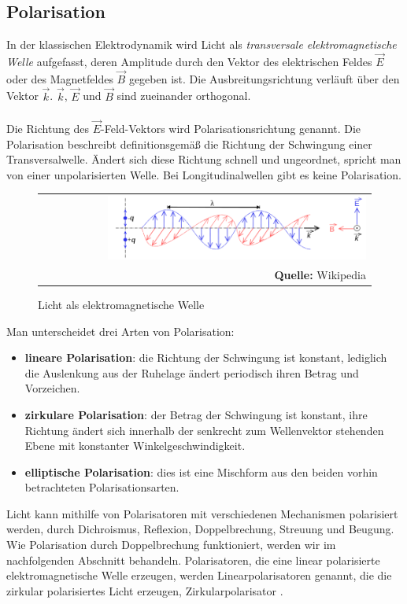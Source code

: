\documentclass[a4paper,titlepage]{scrartcl}
\numberwithin{equation}{section}
\begin{document}
\subsection{Polarisation}
In der klassischen Elektrodynamik wird Licht als \emph{transversale elektromagnetische Welle} aufgefasst, deren Amplitude durch den Vektor des elektrischen Feldes $\vec{E}$ oder des Magnetfeldes $\vec{B}$ gegeben ist. Die Ausbreitungsrichtung verläuft über den Vektor $\vec{k}$. $\vec{k}$, $\vec{E}$ und $\vec{B}$ sind zueinander orthogonal.\\ \\
Die Richtung des $\vec{E}$-Feld-Vektors wird Polarisationsrichtung genannt. Die Polarisation beschreibt definitionsgemäß die Richtung der Schwingung einer Transversalwelle. Ändert sich diese Richtung schnell und ungeordnet, spricht man von einer unpolarisierten Welle. Bei Longitudinalwellen gibt es keine Polarisation.
\begin{figure}[H]
	\centering
	\begin{tabular}{@{}r@{}}
		\includegraphics[width=0.8\textwidth]{bilder/licht.png}\\
		\footnotesize\sffamily\textbf{Quelle:} Wikipedia \cite{wiki:licht}
	\end{tabular}
	\caption{Licht als elektromagnetische Welle}
	\label{fig:licht}
\end{figure}
Man unterscheidet drei Arten von Polarisation:
\begin{itemize}
\item \textbf{lineare Polarisation}: die Richtung der Schwingung ist konstant, lediglich die Auslenkung aus der Ruhelage ändert periodisch ihren Betrag und Vorzeichen.
\item \textbf{zirkulare Polarisation}: der Betrag der Schwingung ist konstant, ihre Richtung ändert sich innerhalb der senkrecht zum Wellenvektor stehenden Ebene mit konstanter Winkelgeschwindigkeit.
\item \textbf{elliptische Polarisation}: dies ist eine Mischform aus den beiden vorhin betrachteten Polarisationsarten.
\end{itemize}
Licht kann mithilfe von Polarisatoren mit verschiedenen Mechanismen polarisiert werden, durch Dichroismus, Reflexion, Doppelbrechung, Streuung und Beugung. Wie Polarisation durch Doppelbrechung funktioniert, werden wir im nachfolgenden Abschnitt behandeln. Polarisatoren, die eine linear polarisierte elektromagnetische Welle erzeugen, werden Linearpolarisatoren genannt, die die zirkular polarisiertes Licht erzeugen, Zirkularpolarisator \cite{wiki:polarisator}.\\ \\
\end{document}
